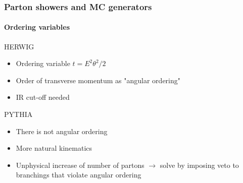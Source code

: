 \documentclass[aspectratio=43]{beamer}
\begin{document}
\begin{frame}

	\frametitle{Parton showers and MC generators}
	\framesubtitle{Ordering variables}
	
	HERWIG
	\begin{itemize} 
		\item Ordering variable $t = E^{2}\theta^{2}/2$
		\item Order of transverse momentum as "angular ordering"
		\item IR cut-off needed
	\end{itemize}

	PYTHIA
	\begin{itemize} 
		\item There is not angular ordering
		\item More natural kinematics
		\item Unphysical increase of number of partons $\longrightarrow$ solve by imposing veto to branchings that violate angular ordering
	\end{itemize}

\end{frame}
\end{document}
